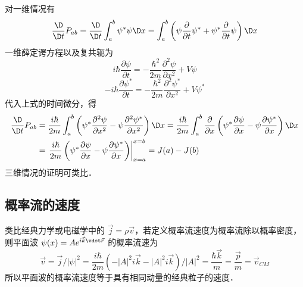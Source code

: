 对一维情况有
\begin{equation}
\frac{\D}{{\D t}}{P_{ab}} = \frac{\D}{{\D t}}\int_a^b {{\psi ^ * }\psi \D x}  = \int_a^b {\left( {\psi \frac{\partial }{{\partial t}}{\psi ^ * } + {\psi ^ * }\frac{\partial }{{\partial t}}\psi } \right)\D x}
\end{equation}
一维薛定谔方程以及复共轭为
\begin{equation}
i\hbar \frac{{\partial \psi }}{{\partial t}} =  - \frac{{{\hbar ^2}}}{{2m}}\frac{{{\partial ^2}\psi }}{{\partial {x^2}}} + V\psi
\end{equation}
\begin{equation}
 - i\hbar \frac{{\partial {\psi ^ * }}}{{\partial t}} =  - \frac{{{\hbar ^2}}}{{2m}}\frac{{{\partial ^2}{\psi ^ * }}}{{\partial {x^2}}} + V{\psi ^ * }
\end{equation}
代入上式的时间微分，得
\begin{equation}
\begin{aligned}
  \frac{\D}{{\D t}}{P_{ab}} &= \frac{{i\hbar }}{{2m}}\int_a^b {\left( {{\psi ^ * }\frac{{{\partial ^2}\psi }}{{\partial {x^2}}} - \psi \frac{{{\partial ^2}{\psi ^ * }}}{{\partial {x^2}}}} \right)\D x}  = \frac{{i\hbar }}{{2m}}\int_a^b {\frac{\partial }{{\partial x}}\left( {{\psi ^ * }\frac{{\partial \psi }}{{\partial x}} - \psi \frac{{\partial {\psi ^ * }}}{{\partial x}}} \right)\D x} \\
   &= \left. {\frac{{i\hbar }}{{2m}}\left( {{\psi ^ * }\frac{{\partial \psi }}{{\partial x}} - \psi \frac{{\partial {\psi ^ * }}}{{\partial x}}} \right)} \right|_{x = a}^{x = b} = J(a) - J(b)
\end{aligned}
\end{equation}
三维情况的证明可类比．

\subsection{概率流的速度}

类比经典力学或电磁学中的 $\vec j = \rho \vec v$，若定义概率流速度为概率流除以概率密度，则平面波 $\psi (x) = A{e^{i\vec k \vdot \vec r}}$ 的概率流速为
\begin{equation}
\vec v = \vec j/{\left| \psi  \right|^2} = \frac{{i\hbar }}{{2m}}\left( { - {{\left| A \right|}^2}i\vec k - {{\left| A \right|}^2}i\vec k} \right)/{\left| A \right|^2} = \frac{{\hbar \vec k}}{m} = \frac{{\vec p}}{m} = {\vec v_{CM}}
\end{equation}
所以平面波的概率流速度等于具有相同动量的经典粒子的速度．
